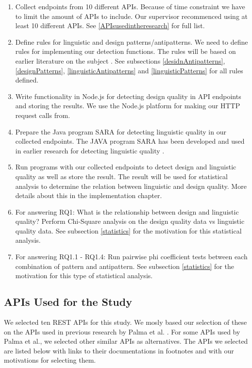 \begin{enumerate}
    \item Collect endpoints from 10 different APIs. Because of time constraint we have to limit the amount of APIs to include. Our supervisor recommenced using at least 10 different APIs. See \ref{APIsusedintheresearch} for full list.
    \item Define rules for linguistic and design patterns/antipatterns. We need to define rules for implementing our detection functions. The rules will be based on earlier literature on the subject \cite{design} \cite{linguistic}. See subsections \ref{desidnAntipatterns}, \ref{designPatterns}, \ref{linguisticAntipatterns} and \ref{linguisticPatterns} for all rules defined.
    \item Write functionality in Node.js for detecting design quality in API endpoints and storing the results. We use the Node.js platform for making our HTTP request calls from.
    \item Prepare the Java program SARA for detecting linguistic quality in our collected endpoints. The JAVA program SARA has been developed and used in earlier research for detecting linguistic quality \cite{linguistic}.
        \item Run programs with our collected endpoints to detect design and linguistic quality as well as store the result. The result will be used for statistical analysis to determine the relation between linguistic and design quality. More details about this in the implementation chapter. 
    \item For answering RQ1: What is the relationship between design and linguistic quality? Perform Chi-Square analysis on the design quality data vs linguistic quality data. See subsection \ref{statistics} for the motivation for this statistical analysis. 
        \item For answering RQ1.1 - RQ1.4: Run pairwise phi coefficient tests between each combination of pattern and antipattern. See subsection \ref{statistics} for the motivation for this type of statistical analysis.
\end{enumerate}

\subsection{APIs Used for the Study} \label{selectedAPIs}

We selected ten REST APIs for this study. We mosly based our selection of these on the APIs used in previous research by Palma et al. \cite{design}\cite{linguistic}. For some APIs used by Palma et al., we selected other similar APIs as alternatives. The APIs we selected are listed below with links to their documentations in footnotes and with our motivations for selecting them. 

